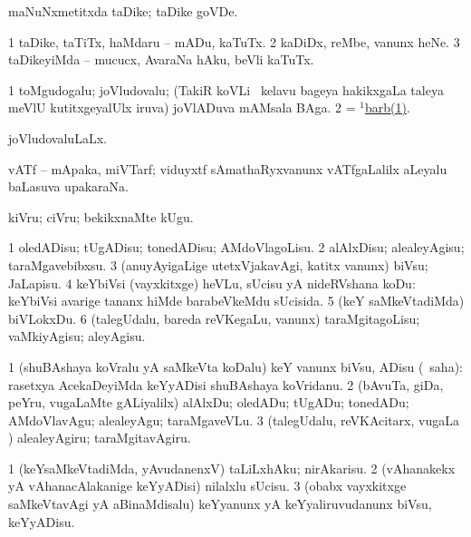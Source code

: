 \noindent 
\gl{\pagu}
\expl{}
\bmng
{} maNuNxmetitxda taDike; taDike goVDe. 
\emng
\eentry

\bentry
{} 
\gl{\sakirx}
\expl{}
\bmng
\bnum
\num{1} taDike, taTiTx, haMdaru -- mADu, kaTuTx. 
\num{2} kaDiDx, reMbe, \mo vanunx heNe. 
\num{3} taDikeyiMda -- mucucx, AvaraNa hAku, beVli kaTuTx. 
\enum
\emng
\eentry

\bentry
{} 
\gl{\nA}
\expl{}
\bmng
\bnum
\num{1} toMgudogalu; joVludovalu; (TakiR koVLi \mo\ kelavu bageya hakikxgaLa taleya meVlU kutitxgeyalUlx iruva) joVlADuva mAMsala BAga. 
\num{2} = \hyperref{kandict_b.pdf}{B}{barb(1)}{$^1$barb(1)}. 
\enum
\emng
\eentry

\bentry
{} 
\gl{\gu}
\expl{}
\bmng
joVludovaluLaLx. 
\emng
\eentry

\bentry
{} 
\gl{\nA}
\expl{}
\bmng
vATf -- mApaka, miVTarf; viduyxtf sAmathaRyxvanunx vATfgaLalilx aLeyalu baLasuva upakaraNa. 
\emng
\eentry

\bentry
{} 
\gl{\akirx}
\expl{}
\bmng
kiVru; ciVru; bekikxnaMte kUgu. 
\emng
\eentry

\bentry
{} 
\gl{\sakirx}
\expl{}
\bmng
\bnum
\num{1} oledADisu; tUgADisu; tonedADisu; AMdoVlagoLisu. 
\num{2} alAlxDisu; alealeyAgisu; taraMgavebibxsu. 
\num{3} (anuyAyigaLige utetxVjakavAgi, katitx \mo vanunx) biVsu; JaLapisu. 
\num{4} keYbiVsi (vayxkitxge) heVLu, sUcisu yA nideRVshana koDu:  keYbiVsi avarige tananx hiMde barabeVkeMdu sUcisida. 
\num{5} (keY saMkeVtadiMda) biVLokxDu. 
\num{6} (talegUdalu, bareda reVKegaLu, \mo vanunx) taraMgitagoLisu; vaMkiyAgisu; aleyAgisu. 
\enum
\emng

\noindent
\gl{\akirx}
\expl{}
\bmng
\bnum
\num{1} (shuBAshaya koVralu yA saMkeVta koDalu) keY \mo vanunx biVsu, ADisu (\sakirx\ saha):  rasetxya AcekaDeyiMda keYyADisi shuBAshaya koVridanu. 
\num{2} (bAvuTa, giDa, peYru, \mo vugaLaMte gALiyalilx) alAlxDu; oledADu; tUgADu; tonedADu; AMdoVlavAgu; alealeyAgu; taraMgaveVLu. 
\num{3} (talegUdalu, reVKAcitarx, \mo vugaLa \vi) alealeyAgiru; taraMgitavAgiru. 
\enum
\emng

\noindent 
\gl{\pagu}
\expl{}
\bmng
\bnum
\num{1}  (keYsaMkeVtadiMda, yAvudanenxV) taLiLxhAku; nirAkarisu. 
\num{2}  (vAhanakekx yA vAhanacAlakanige keYyADisi) nilalxlu sUcisu. 
\num{3}  (obabx vayxkitxge saMkeVtavAgi yA aBinaMdisalu) keYyanunx yA keYyaliruvudanunx biVsu, keYyADisu. 
\enum
\emng
\eentry

